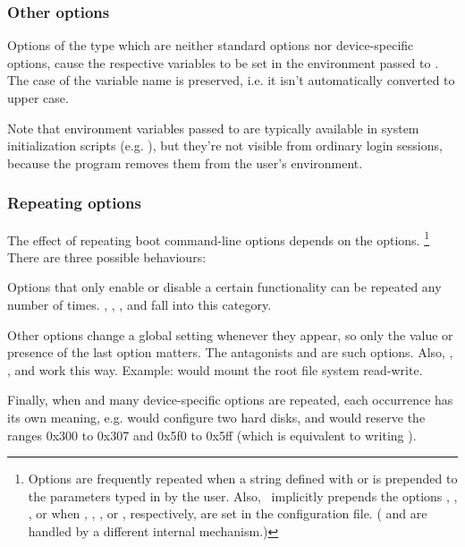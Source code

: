 \subsubsection{Other options}

Options of the type  which are neither
standard options nor device-specific options,
cause the respective variables to be set in the environment passed to
. The case of the variable name is preserved, i.e. it isn't
automatically converted to upper case.

Note that environment variables passed to  are typically
available in system initialization scripts (e.g. ),
but they're not visible from ordinary login sessions, because the 
program removes them from the user's environment.


\subsubsection{Repeating options}

The effect of repeating boot command-line options depends on the options.%
\footnote{Options are frequently repeated when a string defined with
 or  is prepended to the parameters typed in by
the user. Also, \LILO\ implicitly prepends the options ,
, , or  when , ,
, or , respectively, are set in the configuration
file.
( and  are handled by a different internal mechanism.)}
There are three possible behaviours:

Options that only enable or disable a certain functionality can be repeated
any number of times. , , , and 
fall into this category.

Other options change a global setting whenever they appear, so only the
value or presence of the last option matters. The antagonists  and
 are such options. Also, , , and 
work this way. Example:  would mount the root file system
read-write.

Finally, when  and many device-specific options are repeated,
each occurrence has its own meaning, e.g.  would
configure two hard disks, and  would
reserve the ranges 0x300 to 0x307 and 0x5f0 to 0x5ff (which is equivalent to
writing ).


